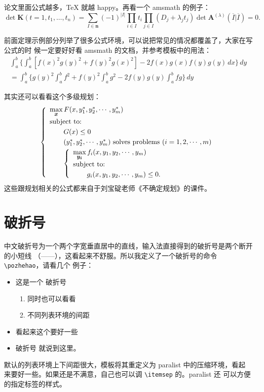 论文里面公式越多，\TeX{} 就越 happy。再看一个 \textsf{amsmath} 的例子：
\newcommand{\envert}[1]{\left\lvert#1\right\rvert} 
\begin{equation}\label{detK2}
\det\mathbf{K}(t=1,t_1,\dots,t_n)=\sum_{I\in\mathbf{n}}(-1)^{\envert{I}}
\prod_{i\in I}t_i\prod_{j\in I}(D_j+\lambda_jt_j)\det\mathbf{A}
^{(\lambda)}(\overline{I}|\overline{I})=0.
\end{equation} 

前面定理示例部分列举了很多公式环境，可以说把常见的情况都覆盖了，大家在写公式的时
候一定要好好看 \textsf{amsmath} 的文档，并参考模板中的用法：
\begin{multline*}%
\int_a^b\biggl\{\int_a^b[f(x)^2g(y)^2+f(y)^2g(x)^2]
 -2f(x)g(x)f(y)g(y)\,dx\biggr\}\,dy \\
 =\int_a^b\biggl\{g(y)^2\int_a^bf^2+f(y)^2
  \int_a^b g^2-2f(y)g(y)\int_a^b fg\biggr\}\,dy
\end{multline*}

其实还可以看看这个多级规划：
\begin{equation}\label{bilevel}
\left\{\begin{array}{l}
\max\limits_{{\mbox{\footnotesize\boldmath $x$}}} F(x,y_1^*,y_2^*,\cdots,y_m^*)\\[0.2cm]
\mbox{subject to:}\\[0.1cm]
\qquad G(x)\le 0\\[0.1cm]
\qquad(y_1^*,y_2^*,\cdots,y_m^*)\mbox{ solves problems }(i=1,2,\cdots,m)\\[0.1cm]
\qquad\left\{\begin{array}{l}
    \max\limits_{{\mbox{\footnotesize\boldmath $y_i$}}}f_i(x,y_1,y_2,\cdots,y_m)\\[0.2cm]
    \mbox{subject to:}\\[0.1cm]
    \qquad g_i(x,y_1,y_2,\cdots,y_m)\le 0.
    \end{array}\right.
\end{array}\right.
\end{equation}
这些跟规划相关的公式都来自于刘宝碇老师《不确定规划》的课件。

\section{破折号}
\label{sec:pozhehao}

中文破折号为一个两个字宽垂直居中的直线，输入法直接得到的破折号是两个断开的小短线
（——），这看起来不舒服。所以我定义了一个破折号的命令 \verb|\pozhehao|，请看几个
例子：
\begin{itemize}
\item 这是一个 \pozhehao 破折号
  \begin{enumerate}[(1)]
  \item 同时也可以看看
  \item 不同列表环境的间距
  \end{enumerate}
\item 看起来这个要好一些
\item 破折号 \pozhehao 就说到这里。
\end{itemize}

默认的列表环境上下间距很大，模板将其重定义为 \textsf{paralist} 中的压缩环境，看起
来要好一些。如果还是不满意，自己也可以调 \verb|\itemsep| 的。\textsf{paralist} 还
可以方便的指定标签的样式。

